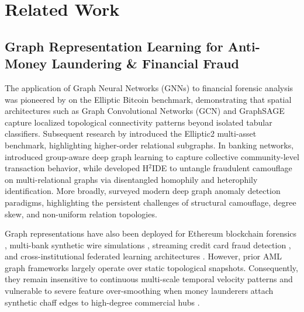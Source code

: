 \section{Related Work}
\label{sec:related_work}

\subsection{Graph Representation Learning for Anti-Money Laundering \& Financial Fraud}
\label{sec:related_graph_aml}
The application of Graph Neural Networks (GNNs) to financial forensic analysis was pioneered by \citet{weber2019anti} on the Elliptic Bitcoin benchmark, demonstrating that spatial architectures such as Graph Convolutional Networks (GCN) \citep{kipf2017semi} and GraphSAGE \citep{hamilton2017inductive} capture localized topological connectivity patterns beyond isolated tabular classifiers. Subsequent research by \citet{bellei2024elliptic2} introduced the Elliptic2 multi-asset benchmark, highlighting higher-order relational subgraphs. In banking networks, \citet{cheng2023anti} introduced group-aware deep graph learning to capture collective community-level transaction behavior, while \citet{fu2025nowhere} developed H$^2$IDE to untangle fraudulent camouflage on multi-relational graphs via disentangled homophily and heterophily identification. More broadly, \citet{qiao2025deep} surveyed modern deep graph anomaly detection paradigms, highlighting the persistent challenges of structural camouflage, degree skew, and non-uniform relation topologies.

Graph representations have also been deployed for Ethereum blockchain forensics \citep{zheng2020xblock}, multi-bank synthetic wire simulations \citep{suzumura2019amlsim, lorenz2020samld}, streaming credit card fraud detection \citep{dalpozzolo2018credit}, and cross-institutional federated learning architectures \citep{wang2023automated}. However, prior AML graph frameworks largely operate over static topological snapshots. Consequently, they remain insensitive to continuous multi-scale temporal velocity patterns and vulnerable to severe feature over-smoothing when money launderers attach synthetic chaff edges to high-degree commercial hubs \citep{dou2020enhancing}.

